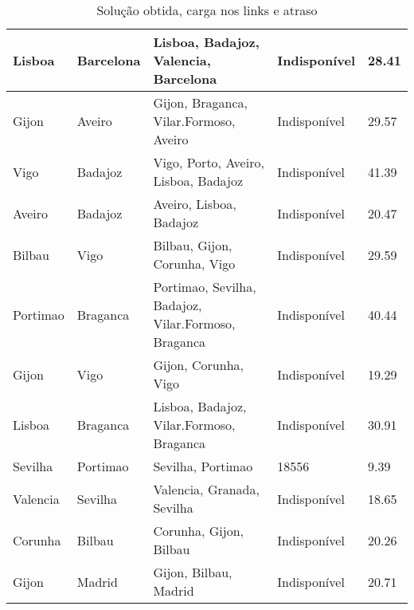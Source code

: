\begin{table}[!htb]
{\begin{tabular}{|l|l|l|l|l|}
Lisboa & Barcelona & Lisboa, Badajoz, Valencia, Barcelona & Indisponível & 28.41 \\ \hline
Gijon & Aveiro & Gijon, Braganca, Vilar.Formoso, Aveiro & Indisponível & 29.57 \\ \hline
Vigo & Badajoz & Vigo, Porto, Aveiro, Lisboa, Badajoz & Indisponível & 41.39 \\ \hline
Aveiro & Badajoz & Aveiro, Lisboa, Badajoz & Indisponível & 20.47 \\ \hline
Bilbau & Vigo & Bilbau, Gijon, Corunha, Vigo & Indisponível & 29.59 \\ \hline
Portimao & Braganca & Portimao, Sevilha, Badajoz, Vilar.Formoso, Braganca & Indisponível & 40.44 \\ \hline
Gijon & Vigo & Gijon, Corunha, Vigo & Indisponível & 19.29 \\ \hline
Lisboa & Braganca & Lisboa, Badajoz, Vilar.Formoso, Braganca & Indisponível & 30.91 \\ \hline
Sevilha & Portimao & Sevilha, Portimao & 18556 & 9.39 \\ \hline
Valencia & Sevilha & Valencia, Granada, Sevilha & Indisponível & 18.65 \\ \hline
Corunha & Bilbau & Corunha, Gijon, Bilbau & Indisponível & 20.26 \\ \hline
Gijon & Madrid & Gijon, Bilbau, Madrid & Indisponível & 20.71 \\ \hline
\end{tabular}}
\caption[]{Solução obtida, carga nos links e atraso}
\end{table}

